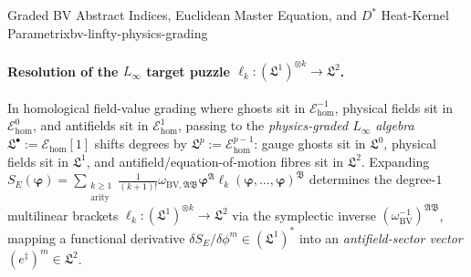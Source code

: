 \begin{zkmodule}{Graded BV Abstract Indices, Euclidean Master Equation, and $D^*$ Heat-Kernel Parametrix}{bv-linfty-physics-grading}
\paragraph{Resolution of the $L_\infty$ target puzzle $\ell_k : (\mathfrak{L}^1)^{\otimes k} \to \mathfrak{L}^2$.}
In homological field-value grading where ghosts sit in $\mathcal{E}_{\mathrm{hom}}^{-1}$, physical fields sit in $\mathcal{E}_{\mathrm{hom}}^0$, and antifields sit in $\mathcal{E}_{\mathrm{hom}}^1$, passing to the \emph{physics-graded $L_\infty$ algebra} $\mathfrak{L}^\bullet := \mathcal{E}_{\mathrm{hom}}[1]$ shifts degrees by $\mathfrak{L}^p := \mathcal{E}_{\mathrm{hom}}^{p-1}$: gauge ghosts sit in $\mathfrak{L}^0$, physical fields sit in $\mathfrak{L}^1$, and antifield/equation-of-motion fibres sit in $\mathfrak{L}^2$. Expanding $S_E(\boldsymbol{\varphi}) = \sum_{\substack{k\ge 1\\\mathrm{arity}}}\frac{1}{(k+1)!}\omega_{\mathrm{BV},\mathfrak{A}\mathfrak{B}}\boldsymbol{\varphi}^{\mathfrak{A}}\ell_k(\boldsymbol{\varphi},\dots,\boldsymbol{\varphi})^{\mathfrak{B}}$ determines the degree-$1$ multilinear brackets $\ell_k : (\mathfrak{L}^1)^{\otimes k} \to \mathfrak{L}^2$ via the symplectic inverse $(\omega_{\mathrm{BV}}^{-1})^{\mathfrak{A}\mathfrak{B}}$, mapping a functional derivative $\delta S_E/\delta\phi^m \in (\mathfrak{L}^1)^*$ into an \emph{antifield-sector vector} $(e^\ddagger)^m \in \mathfrak{L}^2$.


\end{zkmodule}
